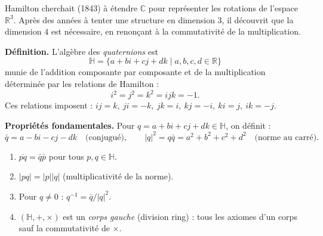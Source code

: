 ﻿%



Hamilton cherchait (1843) à étendre $\mathbb{C}$ pour représenter les rotations
de l'espace $\mathbb{R}^3$. Après des années à tenter une structure en
dimension $3$, il découvrit que la dimension $4$ est nécessaire, en renonçant
à la commutativité de la multiplication.

\begin{tcolorbox}[thmbox]
  \textbf{Définition.}\enspace%
  L'algèbre des \emph{quaternions} est
  \[
    \mathbb{H} = \{a + bi + cj + dk \mid a,b,c,d \in \mathbb{R}\}
  \]
  munie de l'addition composante par composante et de la multiplication
  déterminée par les relations de Hamilton :
  \[
    i^2 = j^2 = k^2 = ijk = -1.
  \]
  Ces relations imposent :
  $ij = k,\ ji = -k,\ jk = i,\ kj = -i,\ ki = j,\ ik = -j$.
\end{tcolorbox}

\decsep{}


\begin{tcolorbox}[thmbox]
  \textbf{Propriétés fondamentales.}\enspace%
  Pour $q = a + bi + cj + dk \in \mathbb{H}$, on définit :
  \[
    \bar{q} = a - bi - cj - dk \quad \text{(conjugué)},
    \qquad
    |q|^2 = q\bar{q} = a^2+b^2+c^2+d^2 \quad \text{(norme au carré)}.
  \]
  \begin{enumerate}
    \item $\overline{pq} = \bar{q}\bar{p}$ pour tous $p,q \in \mathbb{H}$.
    \item $|pq| = |p||q|$ (multiplicativité de la norme).
    \item Pour $q \neq 0$ : $q^{-1} = \bar{q}/|q|^2$.
    \item $(\mathbb{H}, +, \times)$ est un \emph{corps gauche} (division ring) :
          tous les axiomes d'un corps sauf la commutativité de $\times$.
  \end{enumerate}
\end{tcolorbox}

